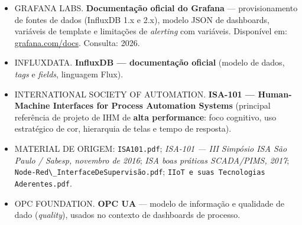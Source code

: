 \begin{itemize}
\tightlist
\item
  GRAFANA LABS. \textbf{Documentação oficial do Grafana} --- provisionamento de fontes de dados (InfluxDB 1.x e 2.x), modelo JSON de dashboards, variáveis de template e limitações de \emph{alerting} com variáveis. Disponível em: \url{grafana.com/docs}. Consulta: 2026.
\item
  INFLUXDATA. \textbf{InfluxDB --- documentação oficial} (modelo de dados, \emph{tags} e \emph{fields}, linguagem Flux).
\item
  INTERNATIONAL SOCIETY OF AUTOMATION. \textbf{ISA-101 --- Human-Machine Interfaces for Process Automation Systems} (principal referência de projeto de IHM de \textbf{alta performance}: foco cognitivo, uso estratégico de cor, hierarquia de telas e tempo de resposta).
\item
  MATERIAL DE ORIGEM: \passthrough{\lstinline!ISA101.pdf!}; \emph{ISA-101 --- III Simpósio ISA São Paulo / Sabesp, novembro de 2016}; \emph{ISA boas práticas SCADA/PIMS, 2017}; \passthrough{\lstinline!Node-Red\_InterfaceDeSupervisão.pdf!}; \passthrough{\lstinline!IIoT e suas Tecnologias Aderentes.pdf!}.
\item
  OPC FOUNDATION. \textbf{OPC UA} --- modelo de informação e qualidade de dado (\emph{quality}), usados no contexto de dashboards de processo.
\end{itemize}
